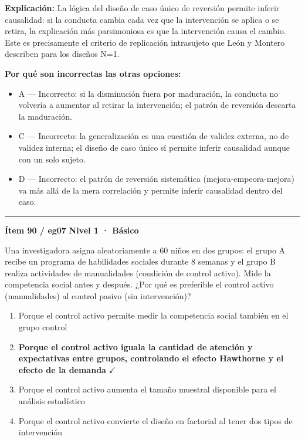 \documentclass[12pt,a4paper]{article}
\begin{document}
\noindent\textbf{\color{azul}Explicación:} La lógica del diseño de caso único de reversión permite inferir causalidad: si la conducta cambia cada vez que la intervención se aplica o se retira, la explicación más parsimoniosa es que la intervención causa el cambio. Este es precisamente el criterio de replicación intrasujeto que León y Montero describen para los diseños N=1.

\noindent\textbf{\color{gris}Por qué son incorrectas las otras opciones:}
\begin{itemize}
  \item {\small A — Incorrecto: si la disminución fuera por maduración, la conducta no volvería a aumentar al retirar la intervención; el patrón de reversión descarta la maduración.}
  \item {\small C — Incorrecto: la generalización es una cuestión de validez externa, no de validez interna; el diseño de caso único sí permite inferir causalidad aunque con un solo sujeto.}
  \item {\small D — Incorrecto: el patrón de reversión sistemática (mejora-empeora-mejora) va más allá de la mera correlación y permite inferir causalidad dentro del caso.}
\end{itemize}
\vspace{8pt}\hrule\vspace{10pt}

\begin{mdframed}[backgroundcolor=fondogris,linecolor=azul,linewidth=1pt,innerleftmargin=10pt,innerrightmargin=10pt,innertopmargin=7pt,innerbottommargin=7pt]
\textbf{Ítem 90 / eg07} \hfill {\small\bfseries\color{azul} Nivel 1 · Básico}
\end{mdframed}

Una investigadora asigna aleatoriamente a 60 niños en dos grupos: el grupo A recibe un programa de habilidades sociales durante 8 semanas y el grupo B realiza actividades de manualidades (condición de control activo). Mide la competencia social antes y después. ¿Por qué es preferible el control activo (manualidades) al control pasivo (sin intervención)?

\begin{enumerate}
  \item[A.] Porque el control activo permite medir la competencia social también en el grupo control
  \item[\textbf{\color{verde}B.}] \textbf{\color{verde} Porque el control activo iguala la cantidad de atención y expectativas entre grupos, controlando el efecto Hawthorne y el efecto de la demanda} \hfill $\checkmark$
  \item[C.] Porque el control activo aumenta el tamaño muestral disponible para el análisis estadístico
  \item[D.] Porque el control activo convierte el diseño en factorial al tener dos tipos de intervención
\end{enumerate}
\end{document}
